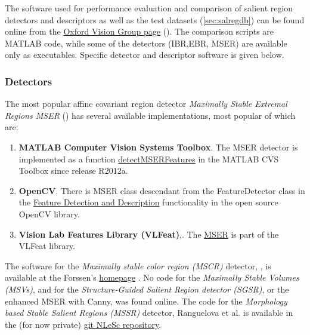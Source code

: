 {The software used for performance evaluation and comparison of salient region detectors and descriptors \cite{Mikolajczyk:2005} as well as the test datasets (\ref{sec:salregdb}) can be found online from the \href{http://www.robots.ox.ac.uk/~vgg/research/affine/index.html}{Oxford Vision Group page} (\cite{vgg_soft_data}). The comparison scripts are MATLAB code, while some of the detectors (IBR,EBR, MSER) are available only as executables. Specific detector and descriptor software is given below.

\subsubsection{Detectors}\label{soft:salregdet:subsec}

The most popular affine covariant region detector {\em Maximally Stable Extremal Regions MSER} (\cite{Matas2002BMVC}) has several available implementations, most popular of which are:
\begin{enumerate}
\item{\bf MATLAB Computer Vision Systems Toolbox}. The MSER detector is implemented as a function \href{http://nl.mathworks.com/help/vision/ref/detectmserfeatures.html}{\textsf{detectMSERFeatures}} in the MATLAB CVS Toolbox since release R2012a. 
\item{\bf OpenCV}. There is MSER class descendant from the \textsf{FeatureDetector} class in the \href{http://docs.opencv.org/modules/features2d/doc/feature_detection_and_description.html}{Feature Detection and Description} functionality in the open source OpenCV library.
\item{\bf Vision Lab Features Library (VLFeat)},\cite{vlfeat_soft}. The \href{http://www.vlfeat.org/api/mser.html}{MSER} is part of the VLFeat library.
\end{enumerate}
The software for the  {\em Maximally stable color region (MSCR)} detector, \cite{Forssen07}, is available at the Forssen's \href{http://www.cs.ubc.ca/~perfo/mscr/}{homepage} \cite{forssen07_soft}.
No code for the {\em Maximally Stable Volumes (MSVs)}, \cite{DonoserB06} and for the {\em Structure-Guided Salient Region detector (SGSR)}, \cite{Fan08} or the enhanced MSER with Canny,\cite{Wang14}  was found online.
The code for the  {\em Morphology based Stable Salient Regions (MSSR) } detector, Ranguelova et al. \cite{RangMSSR06, RangHumpb06} is available in the (for now private) \href{https://github.com/NLeSC/LargeScaleImaging/tree/master/Software}{git NLeSc repository}.

}

